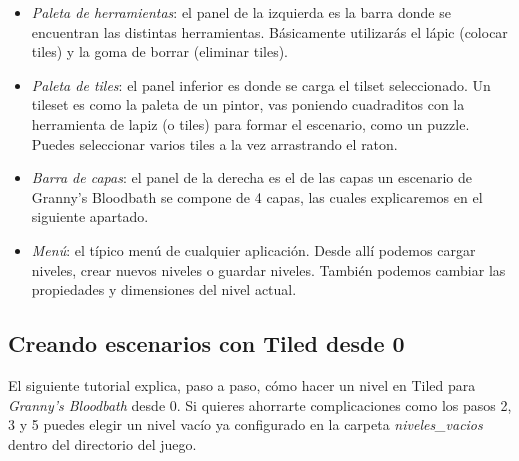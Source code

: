 \begin{itemize}
	\item \emph{Paleta de herramientas}: el panel de la izquierda es
	la barra donde se encuentran las distintas herramientas. Básicamente
	utilizarás el lápic (colocar tiles) y la goma de borrar (eliminar
	tiles).
	\item \emph{Paleta de tiles}: el panel inferior es donde se carga
	el tilset seleccionado. Un tileset es como la paleta de un pintor,
	vas poniendo cuadraditos con la herramienta de lapiz (o tiles) para 
	formar el escenario, como un puzzle. Puedes seleccionar varios
	tiles a la vez arrastrando el raton.
	\item \emph{Barra de capas}: el panel de la derecha es el de las capas
	un escenario de Granny's Bloodbath se compone de 4 capas, las cuales
	explicaremos en el siguiente apartado.	
	\item \emph{Menú}: el típico menú de cualquier aplicación. Desde allí
	podemos cargar niveles, crear nuevos niveles o guardar niveles. También
	podemos cambiar las propiedades y dimensiones del nivel actual.
\end{itemize}

\subsection{Creando escenarios con Tiled desde 0}

El siguiente tutorial explica, paso a paso, cómo hacer un nivel en Tiled para
\emph{Granny's Bloodbath} desde 0. Si quieres ahorrarte complicaciones como
los pasos 2, 3 y 5 puedes elegir un nivel vacío ya configurado en la carpeta
\emph{niveles\_vacios} dentro del directorio del juego.

